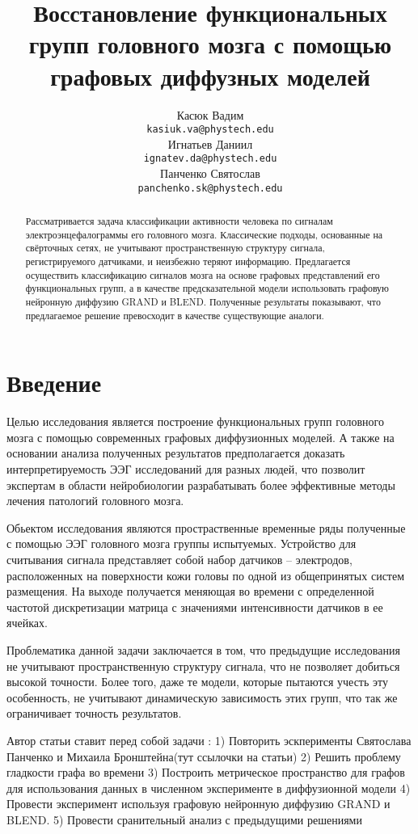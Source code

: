 \documentclass{article}
\title{Восстановление функциональных групп головного мозга с помощью графовых диффузных моделей}
\author{
	Касюк Вадим \\
	\texttt{kasiuk.va@phystech.edu} \\
	\And
	Игнатьев Даниил \\
	\texttt{ignatev.da@phystech.edu} \\
	\And
	Панченко Святослав \\
	\texttt{panchenko.sk@phystech.edu}
}
\date{}
\begin{document}
\maketitle

\begin{abstract}
Рассматривается задача классификации активности человека по сигналам электроэнцефалограммы его головного мозга. Классические подходы, основанные на свёрточных сетях, не учитывают пространственную структуру сигнала, регистрируемого датчиками, и неизбежно теряют информацию. Предлагается осуществить классификацию сигналов мозга на основе графовых представлений его функциональных групп, а в качестве предсказательной модели использовать графовую нейронную диффузию GRAND и BLEND. Полученные результаты показывают, что предлагаемое решение превосходит в качестве существующие аналоги.

\end{abstract}



\section{Введение}

Целью исследования является построение функциональных групп головного мозга с помощью современных графовых диффузионных моделей. А также на основании анализа полученных результатов предполагается доказать интерпретируемость ЭЭГ исследований для разных людей, что позволит экспертам в области нейробиологии разрабатывать более эффективные методы лечения патологий головного мозга.

Обьектом исследования являются простраственные временные ряды полученные с помощью ЭЭГ головного мозга группы испытуемых. Устройство для считывания сигнала представляет собой
набор датчиков – электродов, расположенных на поверхности кожи головы по одной
из общепринятых систем размещения. На выходе получается меняющая во времени с определенной частотой дискретизации матрица с значениями интенсивности датчиков в ее ячейках.

Проблематика данной задачи заключается в том, что предыдущие исследования не учитывают пространственную структуру сигнала, что не позволяет добиться высокой точности. Более того, даже те модели, которые пытаются учесть эту особенность, не учитывают динамическую зависимость этих групп, что так же ограничивает точность результатов.

Автор статьи ставит перед собой задачи : 1) Повторить эскперименты Святослава Панченко и Михаила Бронштейна(тут ссылочки на статьи)
2) Решить проблему гладкости графа во времени 
3) Построить метрическое пространство для графов для использования данных в численном эксперименте в диффузионной модели
4) Провести эксперимент используя графовую нейронную диффузию GRAND и
BLEND.
5) Провести сранительный анализ с предыдущими решениями
\end{document}
